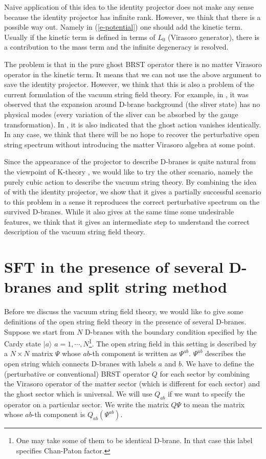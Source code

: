 \documentclass[a4paper,12pt]{article}
\begin{document}
Naive application of this idea to the identity projector
does not make any sense because the identity projector has
infinite rank.
However, we think that there is a possible
way out.  Namely in (\ref{e-potential}) one should add
the kinetic term.  Usually if the kinetic term is defined
in terms of $L_0$ (Virasoro generator), there is a contribution
to the mass term and the infinite degeneracy is resolved.

The problem is that in the pure ghost BRST operator there is no
matter Virasoro operator in the kinetic term. It means that we
can not use the above argument to save the identity projector.
However, we think that this is also a problem of the current
formulation of the
vacuum string field theory.  For example, in \cite{r-RSZ4},
it was observed that the expansion around D-brane background
(the sliver state) has no physical modes (every variation of the sliver 
can be absorbed by the gauge transformation).  In \cite{r-GT2}, it is also
indicated that the ghost action vanishes identically.
In any case, we think that there will be no hope to recover
the perturbative open string spectrum without introducing 
the matter Virasoro algebra at some point.

Since the appearance of the projector to describe D-branes
is quite natural from the viewpoint of K-theory 
\cite{r-Witten3,r-Matsuo0,r-HM},
we would like to try the other scenario, namely the
purely cubic action to describe the vacuum string theory.
By combining the idea of \cite{r-HLRS} with the identity
projector, we show that it gives a partially successful scenario
to this problem in a sense it reproduces the correct
perturbative spectrum on the survived D-branes.  While it
also gives at the same time some undesirable features, 
we think that it gives an intermediate  step to 
understand the correct description of the vacuum string field theory.


\section{SFT in the presence of several D-branes and split string method}

Before we discuss the vacuum string field theory, we would
like to give some definitions of the open string field theory
in the presence of several D-branes.  
Suppose we start from $N$ D-branes with the boundary condition
specified by the Cardy  state $|a\rangle$ $a=1,\cdots,N$\footnote{
One may take some of them to be identical D-brane. In that case
this label specifies Chan-Paton factor.}.
The open string field in this setting is described by
a $N\times N$ matrix $\Psi$ whose $ab$-th component is
written as $\Psi^{ab}$. $\Psi^{ab}$ describes the 
open string which connects D-branes  with labels $a$ and $b$.
We have to define the (perturbative or conventional)
BRST operator $Q$ for each sector by combining the Virasoro operator
of the matter sector (which is different 
for each sector) and the ghost sector which is universal.
We will use $Q_{ab}$ if we want to specify the operator
on a particular sector. We write the matrix $Q\Psi$ 
to mean the matrix whose $ab$-th component is
$Q_{ab}(\Psi^{ab})$.
\end{document}
